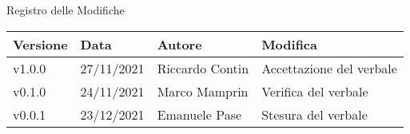 \begin{center}
  \huge{Registro delle Modifiche}
\end{center}

\begin{center}
  \begin{tabular}{|p{2cm}|p{2cm}|p{3cm}|p{5cm}|}
    \hline
    \textbf{Versione} & \textbf{Data} & \textbf{Autore} & \textbf{Modifica}                    \\ \hline
    v1.0.0            & 27/11/2021    & Riccardo Contin   & Accettazione del verbale \\ \hline
    v0.1.0            & 24/11/2021    & Marco Mamprin   & Verifica del verbale \\ \hline
    v0.0.1            & 23/12/2021    & Emanuele Pase   & Stesura del verbale \\ \hline
  \end{tabular}
\end{center}